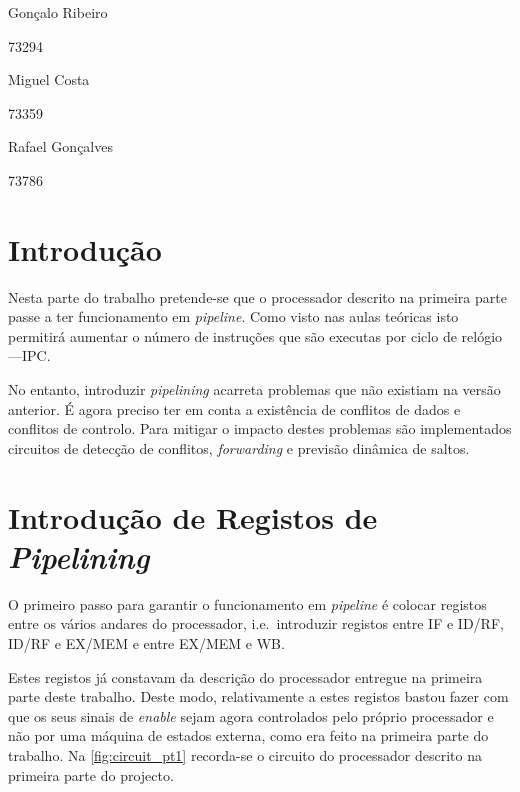 \documentclass[a4paper]{article}
\begin{document}
	
	
	
	\trSetAuthors
		{
		Gonçalo Ribeiro
		
		73294
		}{
		Miguel Costa
		
		73359
		}{
		Rafael Gonçalves
		
		73786
		}
		
	
	\trMakeCover
	
	\tableofcontents
	\pagebreak
	
	\section{Introdução}
	
	Nesta parte do trabalho pretende-se que o processador descrito na primeira parte passe a ter funcionamento em \textit{pipeline}. Como visto nas aulas teóricas isto permitirá aumentar o número de instruções que são executas por ciclo de relógio---IPC.
	
	No entanto, introduzir \textit{pipelining} acarreta problemas que não existiam na versão anterior. É agora preciso ter em conta a existência de conflitos de dados e conflitos de controlo. Para mitigar o impacto destes problemas são implementados circuitos de detecção de conflitos, \textit{forwarding} e previsão dinâmica de saltos.
	
	
	\section{Introdução de Registos de \textit{Pipelining}}
	
	O primeiro passo para garantir o funcionamento em \textit{pipeline} é colocar registos entre os vários andares do processador, i.e.\ introduzir registos entre IF e ID/RF, ID/RF e EX/MEM e entre EX/MEM e WB.
	
	Estes registos já constavam da descrição do processador entregue na primeira parte deste trabalho. Deste modo, relativamente a estes registos bastou fazer com que os seus sinais de \textit{enable} sejam agora controlados pelo próprio processador e não por uma máquina de estados externa, como era feito na primeira parte do trabalho. Na \autoref{fig:circuit_pt1} recorda-se o circuito do processador descrito na primeira parte do projecto.
	
\end{document}
